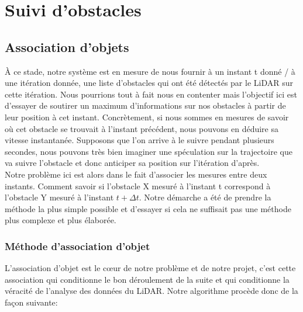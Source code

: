 \section{Suivi d'obstacles}

\subsection{Association d'objets}
\tab À ce stade, notre système est en mesure de nous fournir à un instant t donné / à une itération donnée, une liste d'obstacles qui ont été détectés par le LiDAR sur cette itération. Nous pourrions tout à fait nous en contenter mais l'objectif ici est d'essayer de soutirer un maximum d'informations sur nos obstacles à partir de leur position à cet instant. Concrètement, si nous sommes en mesures de savoir où cet obstacle se trouvait à l'instant précédent, nous pouvons en déduire sa vitesse instantanée. Supposons que l'on arrive à le suivre pendant plusieurs secondes, nous pouvons très bien imaginer une spéculation sur la trajectoire que va suivre l'obstacle et donc anticiper sa position sur l'itération d'après. \\
Notre problème ici est alors dans le fait d'associer les mesures entre deux instants. Comment savoir si l'obstacle X mesuré à l'instant t correspond à l'obstacle Y mesuré à l'instant $t+\Delta t$. Notre démarche a été de prendre la méthode la plus simple possible et d'essayer si cela ne suffisait pas une méthode plus complexe et plus élaborée. \cite{LIDAR2D} \cite{tutoSLAM} \cite{memoire1} \cite{MCMC-SLAM}

\subsubsection{Méthode d'association d'objet}
\tab L'association d'objet est le cœur de notre problème et de notre projet, c'est cette association qui conditionne le bon déroulement de la suite et qui conditionne la véracité de l'analyse des données du LiDAR. Notre algorithme procède donc de la façon suivante:

